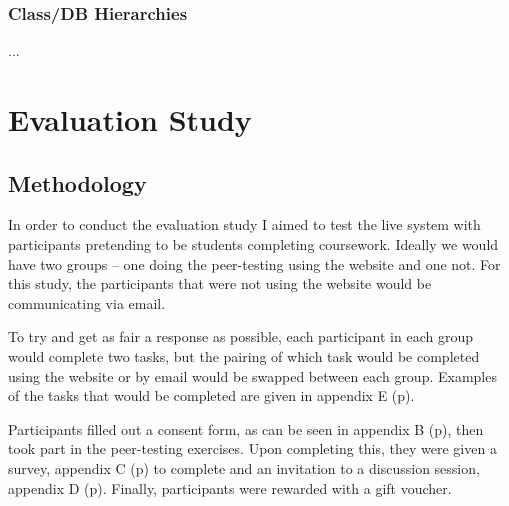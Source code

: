\documentclass[a4paper,11pt]{report}
\begin{document}
\subsection{Class/DB Hierarchies}
\doublespacing
...


\chapter{Evaluation Study}
\label{ch:eval}
\section{Methodology}
In order to conduct the evaluation study I aimed to test the live system with participants pretending to be students completing coursework. Ideally we would have two groups -- one doing the peer-testing using the website and one not. For this study, the participants that were not using the website would be communicating via email.\par
To try and get as fair a response as possible, each participant in each group would complete two tasks, but the pairing of which task would be completed using the website or by email would be swapped between each group. Examples of the tasks that would be completed are given in appendix E (p\pageref{app:descriptors}).\par
Participants filled out a consent form, as can be seen in appendix B (p\pageref{app:consent}), then took part in the peer-testing exercises. Upon completing this, they were given a survey, appendix C (p\pageref{app:survey}) to complete and an invitation to a discussion session, appendix D (p\pageref{app:discussion}). Finally, participants were rewarded with a gift voucher.
\end{document}
